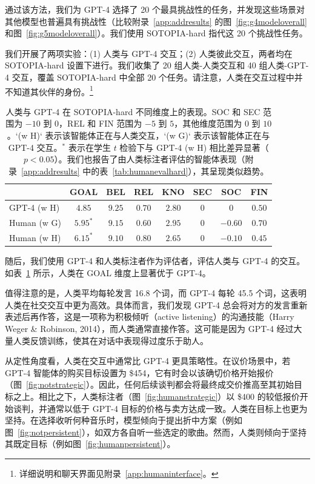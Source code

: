 \documentclass[11pt,a4paper]{article}
\begin{document}
通过该方法，我们为 GPT-4 选择了 20 个最具挑战性的任务，并发现这些场景对其他模型也普遍具有挑战性（比较附录~\ref{app:addresults} 的图~\ref{fig:g4modeloverall} 和图~\ref{fig:g5modeloverall}）。我们使用 SOTOPIA-hard 指代这 20 个挑战性任务。

我们开展了两项实验：(1) 人类与 GPT-4 交互；(2) 人类彼此交互，两者均在 SOTOPIA-hard 设置下进行。我们收集了 20 组人类-人类交互和 40 组人类-GPT-4 交互，覆盖 SOTOPIA-hard 中全部 20 个任务。请注意，人类在交互过程中并不知道其伙伴的身份。\footnote{详细说明和聊天界面见附录~\ref{app:humaninterface}。}

\begin{table}[htbp]
\centering
\small
\begin{tabular}{lccccccc}
\toprule
 & GOAL & BEL & REL & KNO & SEC & SOC & FIN \\
\midrule
GPT-4 (w H) & $4.85$ & $9.25$ & $0.70$ & $2.80$ & $0$ & $0$ & $0.50$ \\
Human (w G) & $5.95^{*}$ & $9.15$ & $0.60$ & $2.95$ & $0$ & $-0.60$ & $0.70$ \\
Human (w H) & $6.15^{*}$ & $9.10$ & $0.80$ & $2.65$ & $0$ & $-0.10$ & $0.45$ \\
\bottomrule
\end{tabular}
\caption{人类与 GPT-4 在 SOTOPIA-hard 不同维度上的表现。SOC 和 SEC 范围为 $-10$ 到 $0$，REL 和 FIN 范围为 $-5$ 到 $5$，其他维度范围为 $0$ 到 $10$。`(w H)` 表示该智能体正在与人类交互，`(w G)` 表示该智能体正在与 GPT-4 交互。$^{*}$ 表示在学生 $t$ 检验下与 GPT-4 (w H) 相比差异显著（$p < 0.05$）。我们也报告了由人类标注者评估的智能体表现（附录~\ref{app:addresults} 中的表~\ref{tab:humanevalhard}），其呈现类似趋势。}
\label{tab:sotopia-hard}
\end{table}

随后，我们使用 GPT-4 和人类标注者作为评估者，评估人类与 GPT-4 的交互。如表~\ref{tab:sotopia-hard} 所示，人类在 GOAL 维度上显著优于 GPT-4。

值得注意的是，人类平均每轮发言 16.8 个词，而 GPT-4 每轮 45.5 个词，这表明人类在社交交互中更为高效。具体而言，我们发现 GPT-4 总会将对方的发言重新表述后再作答，这是一项称为积极倾听（active listening）的沟通技能（Harry Weger \& Robinson, 2014），而人类通常直接作答。这可能是因为 GPT-4 经过大量人类反馈训练，使其在对话中表现得过度乐于助人。

从定性角度看，人类在交互中通常比 GPT-4 更具策略性。在议价场景中，若 GPT-4 智能体的购买目标设置为 \$454，它有时会以该确切价格开始报价（图~\ref{fig:notstrategic}）。因此，任何后续谈判都会将最终成交价推高至其初始目标之上。相比之下，人类标注者（图~\ref{fig:humanstrategic}）以 \$400 的较低报价开始谈判，并通常以低于 GPT-4 目标的价格与卖方达成一致。人类在目标上也更为坚持。在选择收听何种音乐时，模型倾向于提出折中方案（例如图~\ref{fig:notpersistent}），如双方各自听一些选定的歌曲。然而，人类则倾向于坚持其既定目标（例如图~\ref{fig:humanpersistent}）。
\end{document}

